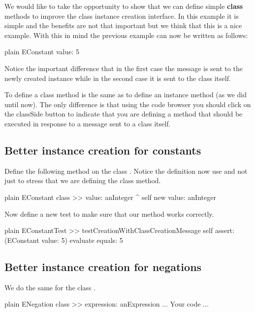 \documentclass[10pt,twoside,english]{_support/latex/sbabook/sbabook}
\begin{document}
We would like to take the opportunity to show that we can define simple \textbf{class} methods to improve the class instance creation interface. In this example it is simple and the benefits are not that important but we think that this is a nice example. With this in mind the previous example can now be written as follows: 

\begin{displaycode}{plain}
EConstant value: 5
\end{displaycode}

Notice the important difference that in the first case the message is sent to the newly created instance while in the second case it is sent to the class itself. 

To define a class method is the same as to define an instance method (as we did until now). The only difference is that using the code browser you should click on the classSide button to indicate that you are defining a method that should be executed in response
to a message sent to a class itself. 
\subsection{Better instance creation for constants}
Define the following method on the class . Notice the definition now use  and not just  to stress that we are defining the class method. 

\begin{displaycode}{plain}
EConstant class >> value: anInteger
	^ self new value: anInteger
\end{displaycode}

Now define a new test to make sure that our method works correctly.

\begin{displaycode}{plain}
EConstantTest >> testCreationWithClassCreationMessage
	self assert: (EConstant value: 5) evaluate equals: 5
\end{displaycode}
\subsection{Better instance creation for  negations}
We do the same for the class .

\begin{displaycode}{plain}
ENegation class >> expression: anExpression
	... Your code ...
\end{displaycode}
\end{document}
